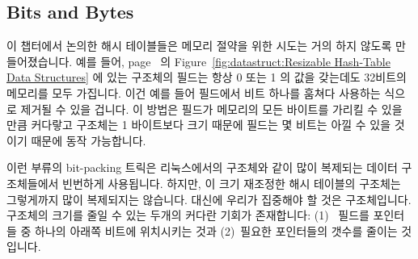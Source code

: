 \subsection{Bits and Bytes}
\label{sec:datastruct:Bits and Bytes}

이 챕터에서 논의한 해시 테이블들은 메모리 절약을 위한 시도는 거의 하지 않도록
만들어졌습니다.
예를 들어,
page~\pageref{fig:datastruct:Resizable Hash-Table Data Structures} 의
Figure~\ref{fig:datastruct:Resizable Hash-Table Data Structures} 에 있는
 구조체의  필드는 항상 0 또는 1 의 값을 갖는데도 32비트의
메모리를 모두 가집니다.
이건 예를 들어  필드에서 비트 하나를 훔쳐다 사용하는 식으로
제거될 수 있을 겁니다.
이 방법은  필드가 메모리의 모든 바이트를 가리킬 수 있을
만큼 커다랗고  구조체는 1 바이트보다 크기 때문에
 필드는 몇 비트는 아낄 수 있을 것이기 때문에 동작
가능합니다.

이런 부류의 bit-packing 트릭은 리눅스에서의  구조체와 같이 많이
복제되는 데이터 구조체들에서 빈번하게 사용됩니다.
하지만, 이 크기 재조정한 해시 테이블의  구조체는 그렇게까지 많이
복제되지는 않습니다.
대신에 우리가 집중해야 할 것은  구조체입니다.
 구조체의 크기를 줄일 수 있는 두개의 커다란 기회가 존재합니다:
(1)~ 필드를  포인터들 중 하나의 아래쪽 비트에
위치시키는 것과 (2)~필요한 포인터들의 갯수를 줄이는 것입니다.

